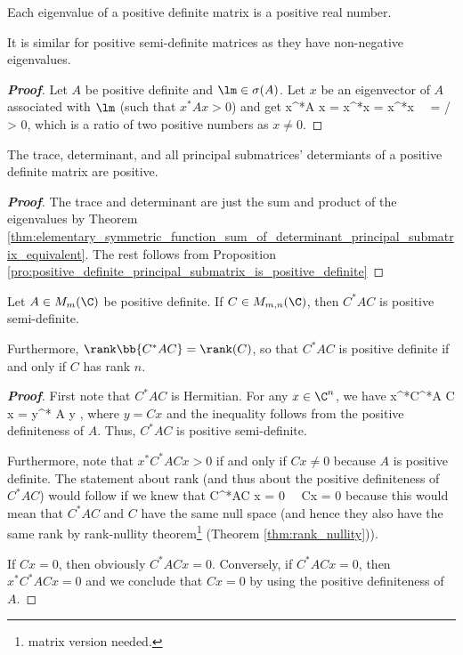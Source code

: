 \begin{proposition}\label{pro:positive_definite_matrix_positive_eigenvalue}
Each eigenvalue of a positive definite matrix is a positive real number. %

It is similar for positive semi-definite matrices as they have non-negative eigenvalues.
\end{proposition}

\begin{proof}[\bf Proof]
Let $A$ be positive definite and $\lm \in \sigma(A)$. Let $x$ be an eigenvector of $A$ associated with $\lm$ (such that $x^*A x >0$) and get
\be
x^*A x = x^*\lm x = \lm x^*x \ \ra \ \lm = / > 0,
\ee
which is a ratio of two positive numbers as $x\neq 0$.
\end{proof}



\begin{proposition}
The trace, determinant, and all principal submatrices' determiants of a positive definite matrix are positive.
\end{proposition}

\begin{proof}[\bf Proof]
The trace and determinant are just the sum and product of the eigenvalues by Theorem \ref{thm:elementary_symmetric_function_sum_of_determinant_principal_submatrix_equivalent}. The rest follows from Proposition \ref{pro:positive_definite_principal_submatrix_is_positive_definite}
\end{proof}


\begin{proposition}\label{pro:product_rank_positive_definite}
Let $A\in M_m(\C)$ be positive definite. If $C\in M_{m,n}(\C)$, then $C^*AC$ is positive semi-definite.

Furthermore, $\rank\bb{C^*AC} = \rank(C)$, so that $C^*AC$ is positive definite if and only if $C$ has rank $n$.
\end{proposition}


\begin{proof}[\bf Proof]    %
First note that $C^*AC$ is Hermitian. For any $x\in \C^n$, we have
\be
x^*C^*A C x = y^* A y ,
\ee
where $y = Cx$ and the inequality follows from the positive definiteness of $A$. Thus, $C^*AC$ is positive semi-definite.

Furthermore, note that $x^*C^*ACx >0$ if and only if $Cx \neq 0$ because $A$ is positive definite. The statement about rank (and thus about the positive definiteness of $C^*AC$) would follow if we knew that
\be
C^*AC x = 0 \ \lra \ Cx = 0
\ee
because this would mean that $C^*AC$ and $C$ have the same null space (and hence they also have the same rank by rank-nullity theorem\footnote{matrix version needed.} (Theorem \ref{thm:rank_nullity})).

If $Cx = 0$, then obviously $C^*ACx = 0$. Conversely, if $C^*ACx = 0$, then $x^*C^*AC x = 0$ and we conclude that $Cx = 0$ by using the positive definiteness of $A$.
\end{proof}


